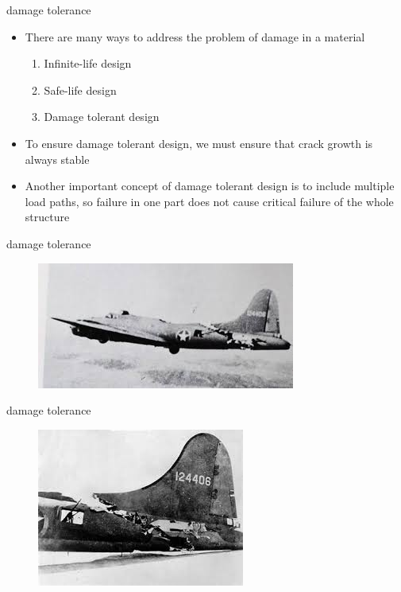 \documentclass[10pt]{beamer}
\begin{document}
\begin{frame}{damage tolerance}
	\begin{itemize}
		\item There are many ways to address the problem of damage in a material
		\begin{enumerate}
			\item Infinite-life design
			\item Safe-life design
			\item Damage tolerant design
		\end{enumerate}
		\item To ensure damage tolerant design, we must ensure that crack growth is always stable
		\item Another important concept of damage tolerant design is to include multiple load paths, so failure in one part does not cause critical failure of the whole structure
	\end{itemize}
\end{frame}

\begin{frame}{damage tolerance}
\begin{figure}
\centering
\includegraphics[width=0.7\linewidth]{B17}
\label{fig:B17}
\end{figure}
\end{frame}

\begin{frame}{damage tolerance}
	\begin{figure}
		\centering
		\includegraphics[width=0.7\linewidth]{B17a}
		\label{fig:B17a }
	\end{figure}
\end{frame}
\end{document}
